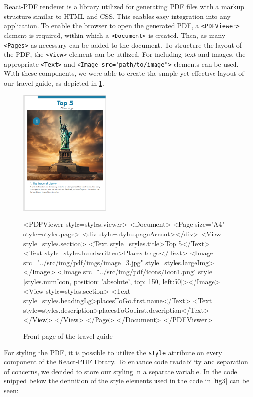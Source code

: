 \documentclass[english,notitlepage,smartquotes]{hgbreport}
\begin{document}
React-PDF renderer is a library utilized for generating PDF files with a markup structure similar to HTML and CSS. This enables easy integration into any application. To enable the browser to open the generated PDF, a \texttt{<PDFViewer>} element is required, within which a \texttt{<Document>} is created. Then, as many \texttt{<Pages>} as necessary can be added to the document. To structure the layout of the PDF, the \texttt{<View>} element can be utilized. For including text and images, the appropriate \texttt{<Text>} and \texttt{<Image src="path/to/image">} elements can be used. With these components, we were able to create the simple yet effective layout of our travel guide, as depicted in \ref{fig2}.

\begin{figure}
	\centering
	\includegraphics[width=0.4\textwidth]{Guide_NY_Top5.png}
	\caption{Front page of the travel guide}
	\label{fig2}
	
	\begin{HtmlCode}
<PDFViewer style={styles.viewer}>
	<Document>
		<Page size="A4" style={styles.page}>
			<div style={styles.pageAccent}></div>
				<View style={styles.section}>
					<Text style={styles.title}>Top 5</Text>
					<Text style={styles.handwritten}>Places to go</Text>
					<Image src="../src/img/pdf/imgs/image_3.jpg" 
						style={styles.largeImg}></Image>
					<Image src="../src/img/pdf/icons/Icon1.png" style={[styles.numIcon, 
						{ position: 'absolute', top: 150, left:50}]}></Image>
					<View style={styles.section}>
					<Text style={styles.headingLg}>{placesToGo.first.name}</Text>
					<Text style={styles.description}>{placesToGo.first.description}</Text>
				</View>
			</View>
		</Page>
 </Document>
</PDFViewer>
	\end{HtmlCode}
\end{figure}
For styling the PDF, it is possible to utilize the \texttt{style} attribute on every component of the React-PDF library. To enhance code readability and separation of concerns, we decided to store our styling in a separate variable. In the code snipped below the definition of the style elements used in the code in \ref{fig3} can be seen:
\end{document}
